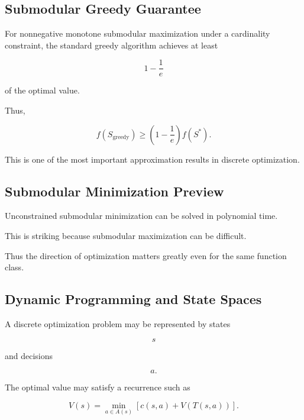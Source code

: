 \subsection{Submodular Greedy Guarantee}
\label{subsec:submodular-greedy-guarantee}

For nonnegative monotone submodular maximization under a cardinality
constraint, the standard greedy algorithm achieves at least

\[
\boxed{
1-\frac1e
}
\]

of the optimal value.

Thus,

\[
\boxed{
f(S_{\mathrm{greedy}})
\geq
\left(
1-\frac1e
\right)
f(S^*).
}
\]

This is one of the most important approximation results in discrete
optimization.

\subsection{Submodular Minimization Preview}
\label{subsec:submodular-minimization-preview}

Unconstrained submodular minimization can be solved in polynomial time.

This is striking because submodular maximization can be difficult.

Thus the direction of optimization matters greatly even for the same
function class.

\subsection{Dynamic Programming and State Spaces}
\label{subsec:combinatorial-dp-state-spaces}

A discrete optimization problem may be represented by states

\[
s
\]

and decisions

\[
a.
\]

The optimal value may satisfy a recurrence such as

\[
\boxed{
V(s)
=
\min_{a\in A(s)}
\left[
c(s,a)
+
V(T(s,a))
\right].
}
\]

